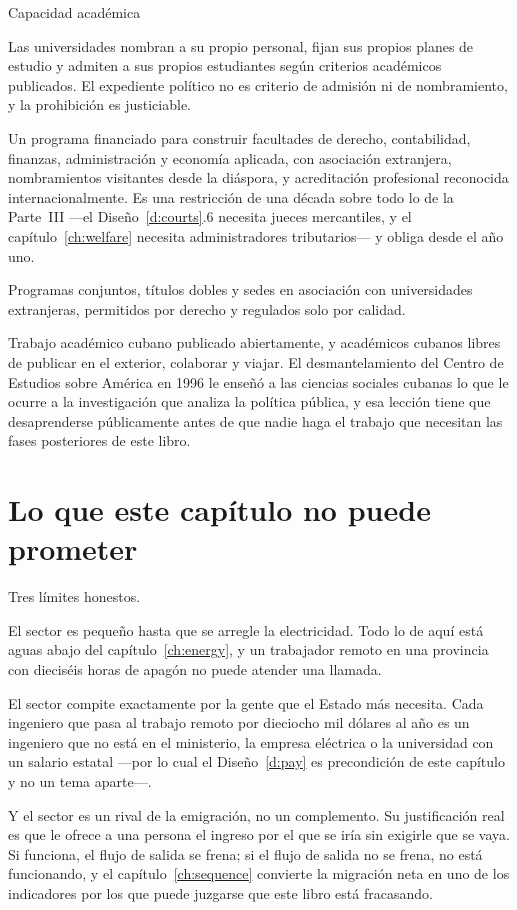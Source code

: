 \begin{design}{Capacidad académica}
\label{d:university}
\begin{rules}
 Las universidades nombran a su propio personal, fijan sus propios planes de
estudio y admiten a sus propios estudiantes según criterios académicos publicados. El
expediente político no es criterio de admisión ni de nombramiento, y la prohibición es
justiciable.

 Un programa financiado para construir facultades de derecho,
contabilidad, finanzas, administración y economía aplicada, con asociación extranjera,
nombramientos visitantes desde la diáspora, y acreditación profesional reconocida
internacionalmente. Es una restricción de una década sobre todo lo de la Parte~III ---el
Diseño~\ref{d:courts}.6 necesita jueces mercantiles, y el capítulo~\ref{ch:welfare} necesita
administradores tributarios--- y obliga desde el año uno.

 Programas conjuntos, títulos dobles y sedes en asociación con
universidades extranjeras, permitidos por derecho y regulados solo por calidad.

 Trabajo académico cubano publicado abiertamente, y académicos
cubanos libres de publicar en el exterior, colaborar y viajar. El desmantelamiento del Centro
de Estudios sobre América en 1996 le enseñó a las ciencias sociales cubanas lo que le ocurre a
la investigación que analiza la política pública, y esa lección tiene que desaprenderse
públicamente antes de que nadie haga el trabajo que necesitan las fases posteriores de este
libro.
\end{rules}
\end{design}

\section{Lo que este capítulo no puede prometer}

Tres límites honestos.

El sector es pequeño hasta que se arregle la electricidad. Todo lo de aquí está aguas abajo
del capítulo~\ref{ch:energy}, y un trabajador remoto en una provincia con dieciséis horas de
apagón no puede atender una llamada.

El sector compite exactamente por la gente que el Estado más necesita. Cada ingeniero que
pasa al trabajo remoto por dieciocho mil dólares al año es un ingeniero que no está en el
ministerio, la empresa eléctrica o la universidad con un salario estatal ---por lo cual el
Diseño~\ref{d:pay} es precondición de este capítulo y no un tema aparte---.

Y el sector es un rival de la emigración, no un complemento. Su justificación real es que le
ofrece a una persona el ingreso por el que se iría sin exigirle que se vaya. Si funciona, el
flujo de salida se frena; si el flujo de salida no se frena, no está funcionando, y el
capítulo~\ref{ch:sequence} convierte la migración neta en uno de los indicadores por los que
puede juzgarse que este libro está fracasando.
